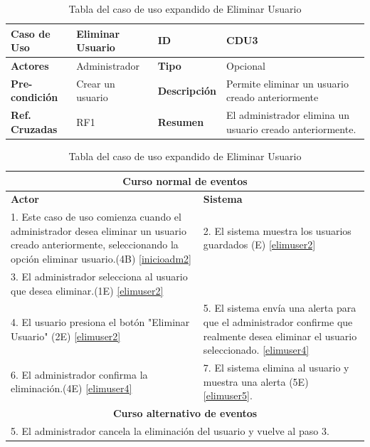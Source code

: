 \begin{table}
	\centering
	\begin{tabular}{|p{3cm}|p{3cm}|p{2cm} |p{3cm}|}
		\hline \textbf{Caso de Uso} & Eliminar Usuario & \textbf{ID} & CDU3 \\ 
		\hline \textbf{Actores} & Administrador & \textbf{Tipo} & Opcional \\ 
		\hline \textbf{Pre-condición} & Crear un usuario & \textbf{Descripción} & Permite eliminar un usuario creado anteriormente \\
		\hline \textbf{Ref. Cruzadas} & RF1 & \textbf{Resumen} & El administrador elimina un usuario creado anteriormente.\\ 
		\hline
	\end{tabular}  
	\begin{tabular}{|p{6cm}|p{6cm}|}
		\multicolumn{2}{|c|}{\textbf{Curso normal de eventos}} \\
		\hline \textbf{Actor} & \textbf{Sistema} \\ 
		\hline 1. Este caso de uso comienza cuando el administrador desea eliminar un usuario creado anteriormente, seleccionando la opción eliminar usuario.(4B) \ref{inicioadm2} & 2. El sistema muestra los usuarios guardados (E) \ref{elimuser2} \\ 
		3. El administrador selecciona al usuario que desea eliminar.(1E) \ref{elimuser2} & \\
		4. El usuario presiona el botón "Eliminar Usuario" (2E) \ref{elimuser2} & 5. El sistema envía una alerta para que el administrador confirme que realmente desea eliminar el usuario seleccionado. \ref{elimuser4} \\
		6. El administrador confirma la eliminación.(4E) \ref{elimuser4} & 7. El sistema elimina al usuario y muestra una alerta (5E) \ref{elimuser5}. \\
		\hline
		\multicolumn{2}{|c|}{\textbf{Curso alternativo de eventos}} \\
		\hline
		\multicolumn{2}{|p{12cm}|}{5. El administrador cancela la eliminación del usuario y vuelve al paso 3. } \\
		\hline
	\end{tabular}
	\caption{Tabla del caso de uso expandido de Eliminar Usuario}
	\label{tabcdu33}
\end{table}

\clearpage

